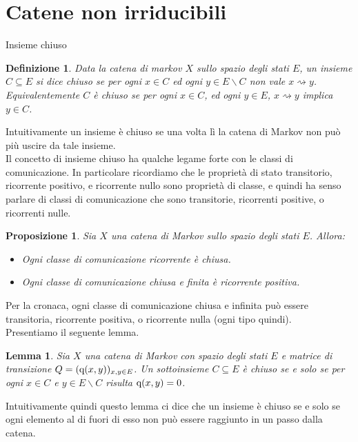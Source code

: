 \documentclass[11pt]{book}
\theoremstyle{Definizione}
\newtheorem*{mydef}{Definizione}
\theoremstyle{TeoremaProposizioneLemmaCorollario}
\newtheorem{mylem}[myteo]{Lemma}
\newtheorem{mypropo}[myteo]{Proposizione}
\theoremstyle{OsservazioneNota}
\newcommand{\tolto}{\smallsetminus}
\newcommand{\conduce}{\rightsquigarrow}
\newcommand{\q}{\textup{q}}
\begin{document}
\section{Catene non irriducibili}
\begin{boxdef}{Insieme chiuso}
\begin{mydef}
Data la catena di markov $X$ sullo spazio degli stati $E$, un insieme $C \subseteq E$ si dice chiuso se per ogni $x\in C$ ed ogni $y\in E \tolto C$ non vale $x \conduce y$. Equivalentemente $C$ è chiuso se per ogni $x\in C$, ed ogni $y\in E$, $x \conduce y$ implica $y\in C$.
\end{mydef}
\end{boxdef}
\noindent
Intuitivamente un insieme è chiuso se  una volta lì la catena di Markov non può più uscire da tale insieme.\\
Il concetto di insieme chiuso ha qualche legame forte con le classi di comunicazione. In particolare ricordiamo che le proprietà di stato transitorio, ricorrente positivo, e ricorrente nullo sono proprietà di classe, e quindi ha senso parlare di classi di comunicazione che sono transitorie, ricorrenti positive, o ricorrenti nulle.
\begin{boxpro}
\begin{mypropo}
Sia $X$ una catena di Markov sullo spazio degli stati $E$. Allora:
\begin{itemize}
\item Ogni classe di comunicazione ricorrente è chiusa.
\item Ogni classe di comunicazione chiusa e finita è ricorrente positiva.
\end{itemize}
\end{mypropo}
\end{boxpro}
\noindent
Per la cronaca, ogni classe di comunicazione chiusa e infinita può essere transitoria, ricorrente positiva, o ricorrente nulla (ogni tipo quindi).\\
Presentiamo il seguente lemma.
\begin{boxoss}
\begin{mylem}
Sia $X$ una catena di Markov con spazio degli stati $E$ e matrice di transizione $Q = (\q(x,y))_{x,y\in E}$. Un sottoinsieme $C\subseteq E$ è chiuso se e solo se per ogni $x\in C$ e $y\in E\tolto C$ risulta $\q(x,y) = 0$.
\end{mylem}
\end{boxoss}
\noindent
Intuitivamente quindi questo lemma ci dice che un insieme è chiuso se e solo se ogni elemento al di fuori di esso non può essere raggiunto in un passo dalla catena.
\end{document}
